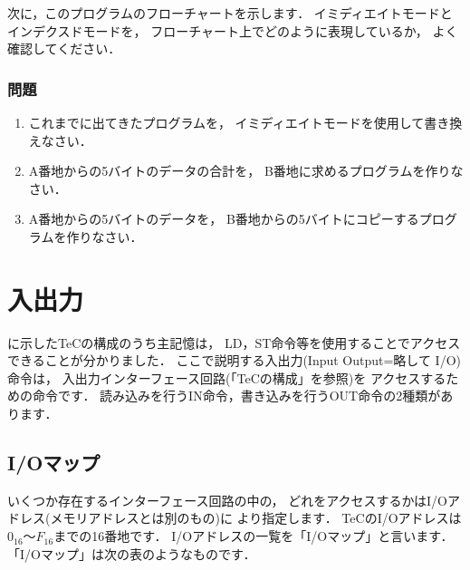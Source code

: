 次に，このプログラムのフローチャートを示します．
イミディエイトモードとインデクスドモードを，
フローチャート上でどのように表現しているか，
よく確認してください．

\begin{center}
\epsfxsize=3.5cm
\end{center}

\newpage
\subsubsection{問題}
\begin{enumerate}
\item これまでに出てきたプログラムを，
イミディエイトモードを使用して書き換えなさい．
\item A番地からの5バイトのデータの合計を，
B番地に求めるプログラムを作りなさい．
\item A番地からの5バイトのデータを，
B番地からの5バイトにコピーするプログラムを作りなさい．
\end{enumerate}

\newpage
\section{入出力}

に示したTeCの構成のうち主記憶は，
LD，ST命令等を使用することでアクセスできることが分かりました．
ここで説明する入出力(Input Output=略して I/O)命令は，
入出力インターフェース回路(「TeCの構成」を参照)を
アクセスするための命令です．
読み込みを行うIN命令，書き込みを行うOUT命令の2種類があります．

\subsection{I/Oマップ}
\label{iomap}

いくつか存在するインターフェース回路の中の，
どれをアクセスするかはI/Oアドレス(メモリアドレスとは別のもの)に
より指定します．
TeCのI/Oアドレスは$0_{16}$〜$F_{16}$までの16番地です．
I/Oアドレスの一覧を「I/Oマップ」と言います．
「I/Oマップ」は次の表のようなものです．

